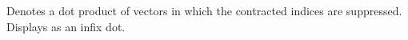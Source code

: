 
Denotes a dot product of vectors in which the contracted indices are
suppressed. Displays as an infix dot.



